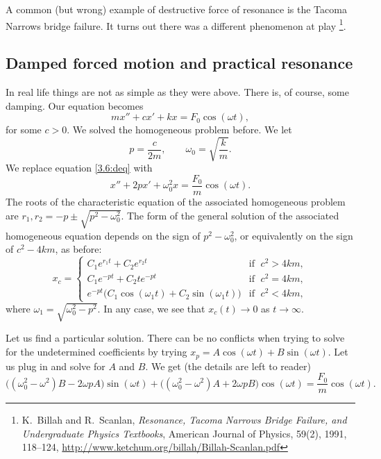 A common (but wrong) example of destructive force of resonance is the Tacoma
Narrows bridge failure.  It turns out there was a different
phenomenon at play%
\footnote{K.\ Billah and R.\ Scanlan, \emph{Resonance, Tacoma Narrows
Bridge Failure, and Undergraduate Physics Textbooks}, American Journal of
Physics, 59(2), 1991, 118--124,
\url{http://www.ketchum.org/billah/Billah-Scanlan.pdf}}.

\subsection{Damped forced motion and practical resonance}

In real life things are not as simple as they were above.  There is,
of course, some damping.  Our equation becomes
\begin{equation} \label{3.6:deq}
mx'' + cx' + kx = F_0 \cos (\omega t) ,
\end{equation}
for some $c > 0$.  We solved the homogeneous problem before.  We let
\begin{equation*}
p = \frac{c}{2m},  \qquad \omega_0 = \sqrt{\frac{k}{m}} .
\end{equation*}
We replace equation \eqref{3.6:deq} with
\begin{equation*}
x'' + 2px' + \omega_0^2x = \frac{F_0}{m} \cos (\omega t) .
\end{equation*}
The roots of the characteristic equation of the associated
homogeneous problem are $r_1,r_2 = -p \pm \sqrt{p^2 - \omega_0^2}$.  The form
of the general solution of the associated homogeneous equation
depends on the sign of $p^2 - \omega_0^2$, or
equivalently on the sign of $c^2 - 4km$, as before:
\begin{equation*}
x_c =
\begin{cases}
C_1 e^{r_1 t} + C_2 e^{r_2 t} & \text{if } \; c^2 > 4km , \\
C_1 e^{-p t} + C_2 t e^{-p t} & \text{if } \; c^2 = 4km , \\
e^{-p t} \bigl( C_1 \cos (\omega_1 t) + C_2 \sin (\omega_1 t) \bigr) &
  \text{if } \; c^2 < 4km ,
\end{cases}
\end{equation*}
where $\omega_1 = \sqrt{\omega_0^2 - p^2}$.  In any case, we see that
$x_c(t) \to 0$ as $t \to \infty$.

\pagebreak[2]
Let us find a particular solution.
There can be no conflicts when trying to solve for the
undetermined coefficients by trying $x_p = A \cos (\omega t)
+ B \sin (\omega t)$.
Let us plug
in and solve for $A$ and $B$.
We get (the  %
details are left to reader)
\begin{equation*}
\bigl((\omega_0^2  - \omega^2)B - 2\omega p A\bigr) \sin (\omega t)
+
\bigl((\omega_0^2  - \omega^2)A + 2\omega p B\bigr) \cos (\omega t)
=
\frac{F_0}{m} \cos (\omega t) .
\end{equation*}

